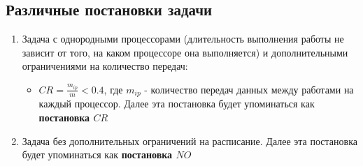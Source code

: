 \subsection{Различные постановки задачи} \label{sec:crit}
\begin{enumerate}
    \item Задача с однородными процессорами (длительность выполнения работы не зависит от того, на каком процессоре она выполняется) и дополнительными ограничениями на количество передач:
          \begin{itemize}
              \item $CR = \frac{m_{ip}}{m} < 0.4$, где $m_{ip}$ - количество передач данных между работами на каждый процессор. Далее эта постановка будет упоминаться как \textbf{постановка $CR$}
          \end{itemize}
    \item Задача без дополнительных ограничений на расписание. Далее эта постановка будет упоминаться как \textbf{постановка $NO$}
\end{enumerate}